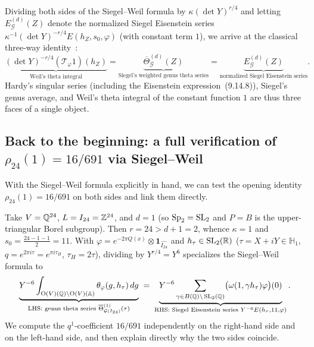 Dividing both sides of the Siegel--Weil formula by $\kappa(\det Y)^{r/4}$ and letting $E_{\mathcal G}^{(d)}(Z)$ denote the normalized Siegel Eisenstein series $\kappa^{-1}(\det Y)^{-r/4}E(h_Z,s_0,\varphi)$ (with constant term $1$), we arrive at the classical three-way identity~\cite[Theorems~2.1.3 and~2.2.9]{Li2023}:
\[
\underbrace{(\det Y)^{-r/4}(\mathcal T_\varphi 1)(h_Z)}_{\text{Weil's theta integral}}
=\underbrace{\overline{\Theta}_{\mathcal G}^{(d)}(Z)}_{\text{Siegel's weighted genus theta series}}
=\underbrace{E_{\mathcal G}^{(d)}(Z)}_{\text{normalized Siegel Eisenstein series}}.
\]
Hardy's singular series (including the Eisenstein expression~(9.14.8)), Siegel's genus average, and Weil's theta integral of the constant function $1$ are thus three faces of a single object.

\subsection{Back to the beginning: a full verification of \texorpdfstring{$\rho_{24}(1)=16/691$}{rho\_24(1) = 16/691} via Siegel--Weil}

With the Siegel--Weil formula explicitly in hand, we can test the opening identity $\rho_{24}(1)=16/691$ on both sides and link them directly.

Take $V=\mathbb{Q}^{24}$, $L=I_{24}=\mathbb{Z}^{24}$, and $d=1$ (so $\mathrm{Sp}_2=\operatorname{SL}_2$ and $P=B$ is the upper-triangular Borel subgroup). Then $r=24>d+1=2$, whence $\kappa=1$ and $s_0=\frac{24-1-1}{2}=11$. With $\varphi=e^{-2\pi Q(x)}\otimes\mathbf 1_{\widehat{I_{24}}}$ and $h_\tau\in\operatorname{SL}_2(\mathbb{R})$ ($\tau=X+iY\in\mathbb H_1$, $q=e^{2\pi i\tau}=e^{\pi i\tau_H}$, $\tau_H=2\tau$), dividing by $Y^{r/4}=Y^6$ specializes the Siegel--Weil formula to
\[
\underbrace{Y^{-6}\int_{\mathrm O(V)(\mathbb{Q})\backslash\mathrm O(V)(\mathbb{A})}\theta_\varphi(g,h_\tau)\,dg}_{\text{LHS: genus theta series }\overline{\Theta}_{\mathcal G(I_{24})}^{(1)}(\tau)}
\;=\;
\underbrace{Y^{-6}\sum_{\gamma\in B(\mathbb{Q})\backslash\operatorname{SL}_2(\mathbb{Q})}\bigl(\omega(1,\gamma h_\tau)\varphi\bigr)(0)}_{\text{RHS: Siegel Eisenstein series }Y^{-6}E(h_\tau,11,\varphi)}.
\]
We compute the $q^1$-coefficient $16/691$ independently on the right-hand side and on the left-hand side, and then explain directly why the two sides coincide.

